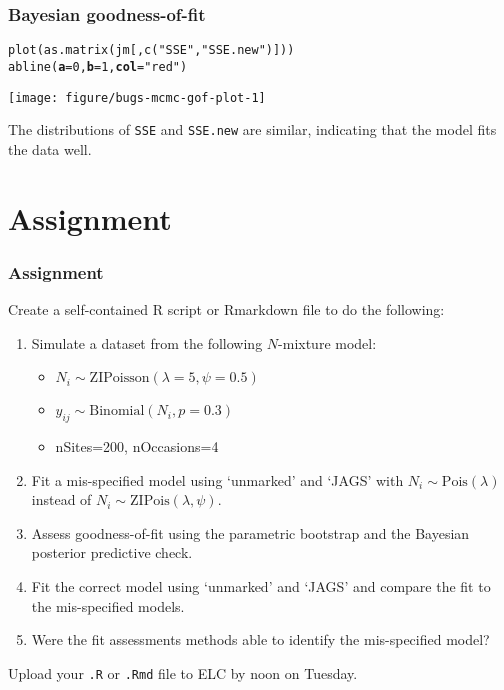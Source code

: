 \documentclass[color=usenames,dvipsnames]{beamer}\usepackage[]{graphicx}\usepackage[]{xcolor}
\makeatletter
\newcommand{\hlnum}[1]{\textcolor[rgb]{0.69,0.494,0}{#1}}%
\newcommand{\hlstr}[1]{\textcolor[rgb]{0.749,0.012,0.012}{#1}}%
\newcommand{\hlstd}[1]{\textcolor[rgb]{0,0,0}{#1}}%
\newcommand{\hlkwc}[1]{\textcolor[rgb]{0,0,0}{\textbf{#1}}}%
\newcommand{\hlkwd}[1]{\textcolor[rgb]{0.004,0.004,0.506}{#1}}%
\newenvironment{kframe}{%
 \def\at@end@of@kframe{}%
 \ifinner\ifhmode%
  \def\at@end@of@kframe{\end{minipage}}%
  \begin{minipage}{\columnwidth}%
 \fi\fi%
 \def\FrameCommand##1{\hskip\@totalleftmargin \hskip-\fboxsep
 \colorbox{shadecolor}{##1}\hskip-\fboxsep
     \hskip-\linewidth \hskip-\@totalleftmargin \hskip\columnwidth}%
 \MakeFramed {\advance\hsize-\width
   \@totalleftmargin\z@ \linewidth\hsize
   \@setminipage}}%
 {\par\unskip\endMakeFramed%
 \at@end@of@kframe}
\newenvironment{knitrout}{}{} %
\newcommand{\inr}[1]{\colorbox{inlinecolor}{\texttt{#1}}}
\makeatother
\begin{document}
\begin{frame}[fragile]
  \frametitle{Bayesian goodness-of-fit}
\begin{knitrout}\footnotesize
{}\color{fgcolor}\begin{kframe}
\begin{alltt}
\hlkwd{plot}\hlstd{(}\hlkwd{as.matrix}\hlstd{(jm[,}\hlkwd{c}\hlstd{(}\hlstr{"SSE"}\hlstd{,} \hlstr{"SSE.new"}\hlstd{)]))}
\hlkwd{abline}\hlstd{(}\hlkwc{a}\hlstd{=}\hlnum{0}\hlstd{,} \hlkwc{b}\hlstd{=}\hlnum{1}\hlstd{,} \hlkwc{col}\hlstd{=}\hlstr{"red"}\hlstd{)}
\end{alltt}
\end{kframe}

{\centering \texttt{[image: figure/bugs-mcmc-gof-plot-1]} 

}


\end{knitrout}
  \vfill
  \small
  The distributions of {\tt SSE} and {\tt SSE.new} are similar,
  indicating that the model fits the data well.
\end{frame}






\section{Assignment}




\begin{frame}[fragile]
  \frametitle{Assignment}
  \footnotesize
  Create a self-contained R script or Rmarkdown file
  to do the following:
  \vfill
  \begin{enumerate}
    \footnotesize
    \item Simulate a dataset from the following $N$-mixture model:
      \begin{itemize}
        \footnotesize
        \item $N_i \sim \mathrm{ZIPoisson}(\lambda=5, \psi=0.5)$
        \item $y_{ij} \sim \mathrm{Binomial}(N_i, p=0.3)$
        \item nSites=200, nOccasions=4
      \end{itemize}
    \item Fit a \alert{mis-specified model} using `unmarked' and `JAGS' with
      $N_i \sim \mathrm{Pois}(\lambda)$ instead of
      $N_i \sim \mathrm{ZIPois}(\lambda, \psi)$.
    \item Assess goodness-of-fit using the parametric bootstrap and
      the Bayesian posterior predictive check.
    \item Fit the \alert{correct model} using `unmarked' and `JAGS'
      and compare the fit to the mis-specified models.
    \item Were the fit assessments methods able to identify the
      mis-specified model?
  \end{enumerate}
  \vfill
  Upload your {\tt .R} or {\tt .Rmd} file to ELC by noon on Tuesday. 
\end{frame}
\end{document}
